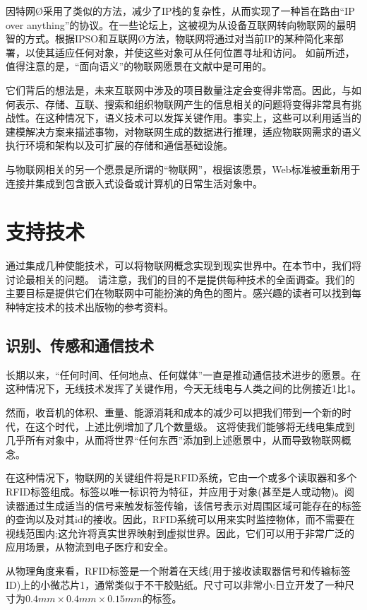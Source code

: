 \documentclass[12pt,a4paper]{article}%
\begin{document}
因特网Ø采用了类似的方法，减少了IP栈的复杂性，从而实现了一种旨在路由“IP over anything”的协议。在一些论坛上，这被视为从设备互联网转向物联网的最明智的方式。根据IPSO和互联网Ø方法，物联网将通过对当前IP的某种简化来部署，以使其适应任何对象，并使这些对象可从任何位置寻址和访问。
如前所述，值得注意的是，“面向语义”的物联网愿景在文献中是可用的。

它们背后的想法是，未来互联网中涉及的项目数量注定会变得非常高。因此，与如何表示、存储、互联、搜索和组织物联网产生的信息相关的问题将变得非常具有挑战性。在这种情况下，语义技术可以发挥关键作用。事实上，这些可以利用适当的建模解决方案来描述事物，对物联网生成的数据进行推理，适应物联网需求的语义执行环境和架构以及可扩展的存储和通信基础设施。

与物联网相关的另一个愿景是所谓的“物联网”，根据该愿景，Web标准被重新用于连接并集成到包含嵌入式设备或计算机的日常生活对象中。


\section{支持技术}
通过集成几种使能技术，可以将物联网概念实现到现实世界中。在本节中，我们将讨论最相关的问题。
请注意，我们的目的不是提供每种技术的全面调查。我们的主要目标是提供它们在物联网中可能扮演的角色的图片。感兴趣的读者可以找到每种特定技术的技术出版物的参考资料。
\subsection{识别、传感和通信技术}
长期以来，“任何时间、任何地点、任何媒体”一直是推动通信技术进步的愿景。在这种情况下，无线技术发挥了关键作用，今天无线电与人类之间的比例接近1比1。

然而，收音机的体积、重量、能源消耗和成本的减少可以把我们带到一个新的时代，在这个时代，上述比例增加了几个数量级。
这将使我们能够将无线电集成到几乎所有对象中，从而将世界“任何东西”添加到上述愿景中，从而导致物联网概念。

在这种情况下，物联网的关键组件将是RFID系统，它由一个或多个读取器和多个RFID标签组成。标签以唯一标识符为特征，并应用于对象(甚至是人或动物)。阅读器通过生成适当的信号来触发标签传输，该信号表示对周围区域可能存在的标签的查询以及对其id的接收。因此，RFID系统可以用来实时监控物体，而不需要在视线范围内;这允许将真实世界映射到虚拟世界。因此，它们可以用于非常广泛的应用场景，从物流到电子医疗和安全。

从物理角度来看，RFID标签是一个附着在天线(用于接收读取器信号和传输标签ID)上的小微芯片1，通常类似于不干胶贴纸。尺寸可以非常小:日立开发了一种尺寸为$0.4mm \times0.4mm\times0.15mm$的标签。
\end{document}
